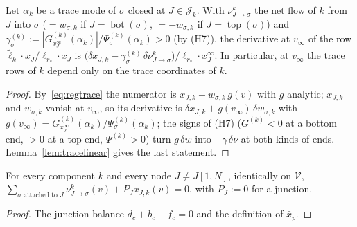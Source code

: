 \documentclass[11pt,a4paper]{report}
\newcommand{\cV}{\mathcal V}
\newcommand{\cJ}{\mathcal J}
\newcommand{\bott}{\operatorname{bot}}
\newcommand{\topp}{\operatorname{top}}
\begin{document}
\begin{lemma}\label{lem:tracerow}
Let \(\alpha_k\) be a trace mode of \(\sigma\) closed at \(J\in\cJ_k\). With \(\nu^k_{J\to\sigma}\) the net flow of \(k\) from \(J\) into \(\sigma\)
(\(=w_{\sigma,k}\) if \(J=\bott(\sigma)\), \(=-w_{\sigma,k}\) if \(J=\topp(\sigma)\)) and
\(\gamma^{(k)}_\sigma:=|G^{(k)}_{x^\infty_J}(\alpha_k)|/\Psi^{(k)}_\sigma(\alpha_k)>0\) (by (H7)), the derivative at \(v_\infty\) of the row
\(\tilde\ell_k\cdot x_J/\ell_{r_*}\cdot x_J\) is
\(\bigl(\delta x_{J,k}-\gamma^{(k)}_\sigma\,\delta\nu^k_{J\to\sigma}\bigr)/\ell_{r_*}\cdot x^\infty_J\). In particular, at \(v_\infty\) the trace rows of
\(k\) depend only on the trace coordinates of \(k\).
\end{lemma}
\begin{proof}
By~\eqref{eq:regtrace} the numerator is \(x_{J,k}+w_{\sigma,k}\,g(v)\) with \(g\) analytic; \(x_{J,k}\) and \(w_{\sigma,k}\) vanish at \(v_\infty\), so
its derivative is \(\delta x_{J,k}+g(v_\infty)\,\delta w_{\sigma,k}\) with \(g(v_\infty)=G^{(k)}_{x^\infty_J}(\alpha_k)/\Psi^{(k)}_\sigma(\alpha_k)\); the
signs of (H7) (\(G^{(k)}<0\) at a bottom end, \(>0\) at a top end, \(\Psi^{(k)}>0\)) turn \(g\,\delta w\) into \(-\gamma\,\delta\nu\) at both kinds of ends.
Lemma~\ref{lem:tracelinear} gives the last statement.
\end{proof}

\begin{lemma}\label{lem:nodeid}
For every component \(k\) and every node \(J\ne J[1,N]\), identically on \(\cV\),
\(\sum_{\sigma\text{ attached to }J}\nu^k_{J\to\sigma}(v)+P_Jx_{J,k}(v)=0\), with \(P_J:=0\) for a junction.
\end{lemma}
\begin{proof}
The junction balance \(d_c+b_c-f_c=0\) and the definition of \(\bar x_p\).
\end{proof}
\end{document}
